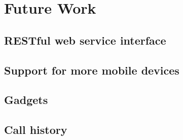 
\chapter{Future Work}
\label{sec:Future Work}

\section{RESTful web service interface}

\section{Support for more mobile devices}

\section{Gadgets}

\section{Call history}


